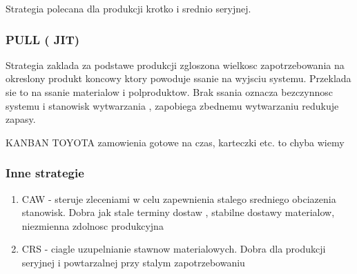 Strategia polecana dla produkcji krotko i srednio seryjnej.
\subsubsection{PULL ( JIT)}
Strategia zaklada za podstawe produkcji zgloszona wielkosc zapotrzebowania na okreslony produkt koncowy ktory powoduje ssanie na wyjsciu systemu. Przeklada sie to na ssanie materialow i polproduktow. Brak ssania oznacza bezczynnosc systemu i stanowisk wytwarzania , zapobiega zbednemu wytwarzaniu redukuje zapasy. 

KANBAN TOYOTA zamowienia gotowe na czas, karteczki etc. to chyba wiemy

\subsubsection{Inne strategie}
\begin{enumerate}
\item CAW - steruje zleceniami w celu zapewnienia stalego sredniego obciazenia stanowisk. Dobra jak stale terminy dostaw , stabilne dostawy materialow, niezmienna zdolnosc produkcyjna
\item CRS - ciagle uzupelnianie stawnow materialowych. Dobra dla produkcji seryjnej i powtarzalnej przy stalym zapotrzebowaniu

\end{enumerate}